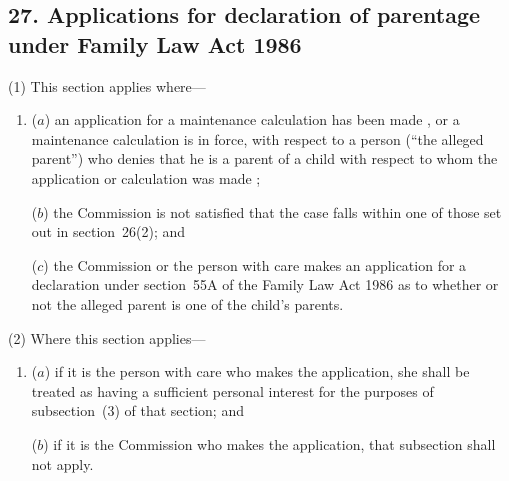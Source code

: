 \documentclass[12pt,a4paper]{article}
\begin{document}
%
%
%
%
%
%

\subsection{27. Applications for declaration of parentage under Family Law Act 1986}

(1) This section applies where—
\begin{enumerate}\item[]
($a$) an application for a maintenance calculation has been made%
, or a maintenance calculation is in force, with respect to a person (“the alleged parent”) who denies that he is a parent of a child with respect to whom the application or calculation was made%
;

($b$) the 
Commission  %
is not satisfied that the case falls within one of those set out in section~26(2); and

($c$) the 
Commission  %
or the person with care makes an application for a declaration under section~55A of the Family Law Act 1986 as to whether or not the alleged parent is one of the child’s parents.
\end{enumerate}

(2) Where this section applies—
\begin{enumerate}\item[]
($a$) if it is the person with care who makes the application, she shall be treated as having a sufficient personal interest for the purposes of subsection~(3)  of that section; and

($b$) if it is the 
Commission  %
who makes the application, that subsection shall not apply.
\end{enumerate}
\end{document}
